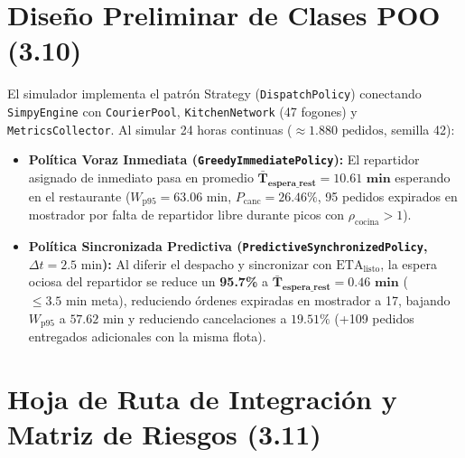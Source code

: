 \documentclass[11pt,letterpaper]{article}
\begin{document}
\section{Diseño Preliminar de Clases POO (3.10)}
El simulador implementa el patrón Strategy (\texttt{DispatchPolicy}) conectando \texttt{SimpyEngine} con \texttt{CourierPool}, \texttt{KitchenNetwork} (47 fogones) y \texttt{MetricsCollector}. Al simular 24 horas continuas ($\approx 1.880\text{ pedidos}$, semilla 42):
\begin{itemize}[leftmargin=1.5em, itemsep=0.2em]
    \item \textbf{Política Voraz Inmediata (\texttt{GreedyImmediatePolicy}):} El repartidor asignado de inmediato pasa en promedio $\mathbf{\bar{T}_{\text{espera\_rest}} = 10.61\text{ min}}$ esperando en el restaurante ($W_{\text{p95}} = 63.06\text{ min}$, $P_{\text{canc}} = 26.46\%$, 95 pedidos expirados en mostrador por falta de repartidor libre durante picos con $\rho_{\text{cocina}} > 1$).
    \item \textbf{Política Sincronizada Predictiva (\texttt{PredictiveSynchronizedPolicy}, $\Delta t = 2.5\text{ min}$):} Al diferir el despacho y sincronizar con $\text{ETA}_{\text{listo}}$, la espera ociosa del repartidor se reduce un \textbf{95.7\%} a $\mathbf{\bar{T}_{\text{espera\_rest}} = 0.46\text{ min}}$ ($\le 3.5\text{ min}$ meta), reduciendo órdenes expiradas en mostrador a 17, bajando $W_{\text{p95}}$ a $57.62\text{ min}$ y reduciendo cancelaciones a $19.51\%$ (+109 pedidos entregados adicionales con la misma flota).
\end{itemize}

\section{Hoja de Ruta de Integración y Matriz de Riesgos (3.11)}
\end{document}
